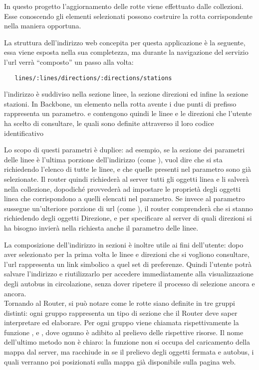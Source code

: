 In questo progetto l'aggiornamento delle rotte viene effettuato dalle collezioni. Esse conoscendo gli elementi selezionati  possono costruire la rotta corrispondente nella maniera opportuna.

La struttura dell'indirizzo web concepita per questa applicazione è la seguente, essa viene esposta nella sua completezza, ma durante la navigazione del servizio l'url verrà ``composto'' un passo alla volta:

\begin{verbatim}
   lines/:lines/directions/:directions/stations
\end{verbatim}

l'indirizzo è suddiviso nella sezione linee, la sezione direzioni ed infine la sezione stazioni. In Backbone, un elemento nella rotta avente i  due punti di prefisso rappresenta un parametro.  e  contengono quindi le linee e le direzioni che l'utente ha scelto di consultare, le quali sono definite attraverso il loro codice identificativo

Lo scopo di questi parametri è duplice: ad esempio, se la sezione dei parametri delle linee è l'ultima porzione dell'indirizzo (come ), vuol dire che si sta richiedendo l'elenco di tutte le linee, e che quelle presenti nel parametro sono già selezionate. Il router quindi richiederà al server tutti gli oggetti linea e li salverà nella collezione, dopodiché provvederà ad impostare le proprietà  degli oggetti linea che corrispondono a quelli elencati nel parametro.
Se invece al parametro sussegue un'ulteriore porzione di url (come ), il router comprenderà che si stanno richiedendo degli oggetti Direzione, e per specificare al server di quali direzioni si ha bisogno invierà nella richiesta anche il parametro delle linee.

La composizione dell'indirizzo in sezioni è inoltre utile ai fini dell'utente: dopo aver selezionato per la prima volta le linee e direzioni che si vogliono consultare, l'url rappresenta un link simbolico a quel set di preferenze. Quindi l'utente potrà salvare l'indirizzo e riutilizzarlo per accedere immediatamente alla visualizzazione degli autobus in circolazione, senza dover ripetere il processo di selezione ancora e ancora.\\

Tornando al Router, si può notare come le rotte siano definite in tre gruppi distinti: ogni gruppo rappresenta un tipo di sezione che il Router deve saper interpretare ed elaborare. Per ogni gruppo viene chiamata rispettivamente la funzione ,  e , dove ognuno è adibito al prelievo delle rispettive risorse. Il nome dell'ultimo metodo non è chiaro: la funzione non si occupa del caricamento della mappa dal server, ma racchiude in se il prelievo degli oggetti fermata e autobus, i quali verranno poi posizionati sulla mappa già disponibile sulla pagina web.

